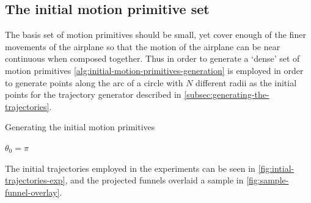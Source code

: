 \subsection{The initial motion primitive set}
\label{subsec:initial-motion-primitive}

The basis set of motion primitives should be small, yet cover enough of the
finer movements of the airplane so that the motion of the airplane can be near
continuous when composed together. Thus in order to generate a `dense' set of
motion primitives \cref{alg:initial-motion-primitives-generation} is employed in
order to generate points along the arc of a circle with \(N\) different radii as
the initial points for the trajectory generator described in
\cref{subsec:generating-the-trajectories}.

\begin{algorithm}
  \caption{Generating the initial motion primitives}
  \label{alg:initial-motion-primitives-generation}
  \DontPrintSemicolon \SetAlgoNoLine

   

  \(\theta_{0} = \pi\) \;

  \;
\end{algorithm}

The initial trajectories employed in the experiments can be seen in
\cref{fig:intial-trajectories-exp}, and the projected funnels overlaid a sample
in \cref{fig:sample-funnel-overlay}.


